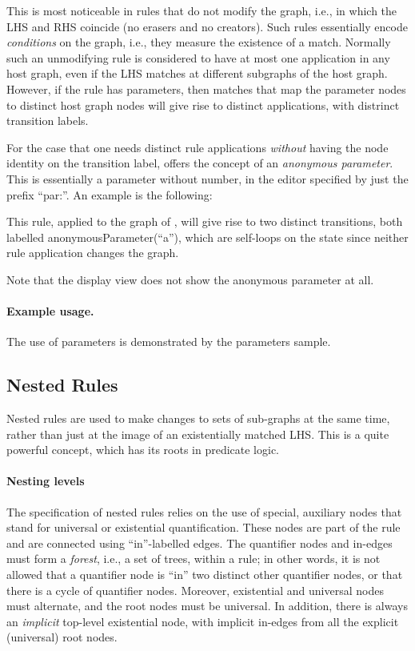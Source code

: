 This is most noticeable in rules that do not modify the graph, i.e., in which
the LHS and RHS coincide (no erasers and no creators). Such rules essentially
encode \emph{conditions} on the graph, i.e., they measure the existence of a
match. Normally such an unmodifying rule is considered to have at most one
application in any host graph, even if the LHS matches at different subgraphs of
the host graph. However, if the rule has parameters, then matches that map the
parameter nodes to distinct host graph nodes will give rise to distinct
applications, with distrinct transition labels.

For the case that one needs distinct rule applications \emph{without} having
the node identity on the transition label, \GROOVE{} offers the concept of an
\emph{anonymous parameter}. This is essentially a parameter without number, in
the editor specified by just the prefix ``\textsf{par:}''. An example is the
following:


This rule, applied to the graph of , will give rise to two
distinct transitions, both labelled \textsf{anonymousParameter(``a'')}, which
are self-loops on the state since neither rule application changes the graph.

Note that the display view does not show the anonymous parameter at all.

\paragraph{Example usage.}

The use of parameters is demonstrated by the \GROOVE \textsf{parameters}
sample.

\subsection{Nested Rules}

Nested rules are used to make changes to sets of sub-graphs at the same time,
rather than just at the image of an existentially matched LHS. This is a quite
powerful concept, which has its roots in predicate logic.

\paragraph{Nesting levels}

The specification of nested rules relies on the use of special, auxiliary nodes
that stand for universal or existential quantification. These nodes are part of
the rule and are connected using ``\textsf{in}''-labelled edges. The quantifier
nodes and \textsf{in}-edges must form a \emph{forest}, i.e., a set of trees,
within a rule; in other words, it is not allowed that a quantifier node is
``\textsf{in}'' two distinct other quantifier nodes, or that there is a cycle
of quantifier nodes. Moreover, existential and universal nodes must alternate,
and the root nodes must be universal. In addition, there is always an
\emph{implicit} top-level existential node, with implicit \textsf{in}-edges
from all the explicit (universal) root nodes.

